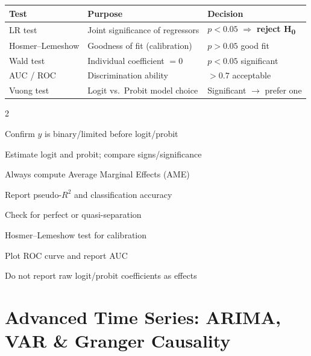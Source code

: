 \documentclass[10pt,a4paper]{article}
\newcommand{\reject}{$\Rightarrow$ \textbf{reject H\textsubscript{0}}}
\begin{document}
\begin{tcolorbox}[tests]
\begin{tabularx}{\linewidth}{lXl}
\toprule
\textbf{Test} & \textbf{Purpose} & \textbf{Decision} \\
\midrule
LR test & Joint significance of regressors & $p < 0.05$ \reject \\
\rowcolor{RowGray}
Hosmer--Lemeshow & Goodness of fit (calibration) & $p > 0.05$ good fit \\
Wald test & Individual coefficient $= 0$ & $p < 0.05$ significant \\
\rowcolor{RowGray}
AUC / ROC & Discrimination ability & $> 0.7$ acceptable \\
Vuong test & Logit vs.\ Probit model choice & Significant $\to$ prefer one \\
\bottomrule
\end{tabularx}
\end{tcolorbox}

\begin{tcolorbox}[checklist]
\begin{multicols}{2}
\begin{checklist}
  \item Confirm $y$ is binary/limited before logit/probit
  \item Estimate logit and probit; compare signs/significance
  \item Always compute Average Marginal Effects (AME)
  \item Report pseudo-$R^2$ and classification accuracy
  \item Check for perfect or quasi-separation
  \item Hosmer--Lemeshow test for calibration
  \item Plot ROC curve and report AUC
  \item Do not report raw logit/probit coefficients as effects
\end{checklist}
\end{multicols}
\end{tcolorbox}

\section{Advanced Time Series: ARIMA, VAR \& Granger Causality}
\end{document}
